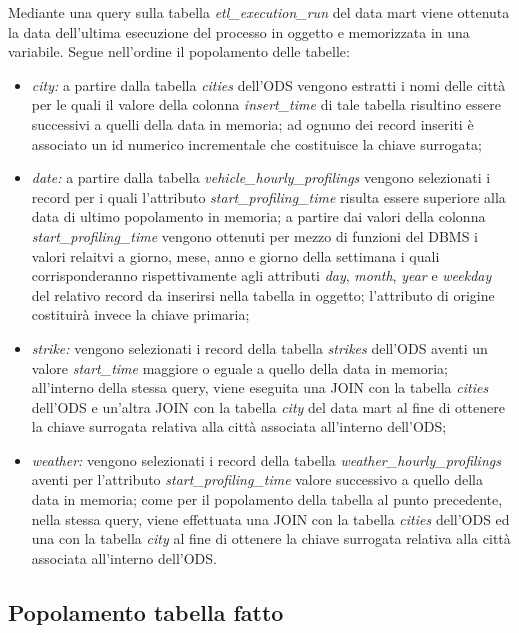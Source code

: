 Mediante una query sulla tabella \textit{etl\_execution\_run} del data mart
viene ottenuta la data dell'ultima esecuzione del processo in oggetto e
memorizzata in una variabile. Segue nell'ordine il popolamento delle tabelle:
\begin{itemize}
\item \textit{city:} a partire dalla tabella \textit{cities} dell'ODS vengono
estratti i nomi delle città per le quali il valore della colonna
\textit{insert\_time} di tale tabella risultino essere successivi a quelli 
della data in memoria; ad ognuno dei record inseriti è associato un id
numerico incrementale che costituisce la chiave surrogata;
\item \textit{date:} a partire dalla tabella \textit{vehicle\_hourly\_profilings}
vengono selezionati i record per i quali l'attributo
\textit{start\_profiling\_time} risulta essere superiore alla data di ultimo
popolamento in memoria; a partire dai valori della colonna
\textit{start\_profiling\_time} vengono ottenuti per mezzo di funzioni del DBMS
i valori relaitvi a giorno, mese, anno e giorno della settimana i quali
corrisponderanno rispettivamente agli attributi \textit{day}, \textit{month},
\textit{year} e \textit{weekday} del relativo record da inserirsi nella tabella
in oggetto; l'attributo di origine costituirà invece la chiave primaria;
\item \textit{strike:} vengono selezionati i record della tabella \textit{strikes}
dell'ODS aventi un valore \textit{start\_time} maggiore o eguale a quello della
data in memoria; all'interno della stessa query, viene eseguita una JOIN con la
tabella \textit{cities} dell'ODS e un'altra JOIN con la tabella \textit{city}
del data mart al fine di ottenere la chiave surrogata relativa alla città
associata all'interno dell'ODS;
\item \textit{weather:} vengono selezionati i record della tabella
\textit{weather\_hourly\_profilings} aventi per l'attributo
\textit{start\_profiling\_time} valore successivo a quello della data in memoria;
come per il popolamento della tabella al punto precedente, nella stessa query,
viene effettuata una JOIN con la tabella \textit{cities} dell'ODS ed una con la
tabella \textit{city} al fine di ottenere la chiave surrogata relativa alla città
associata all'interno dell'ODS.
\end{itemize}

\subsection{Popolamento tabella fatto}

